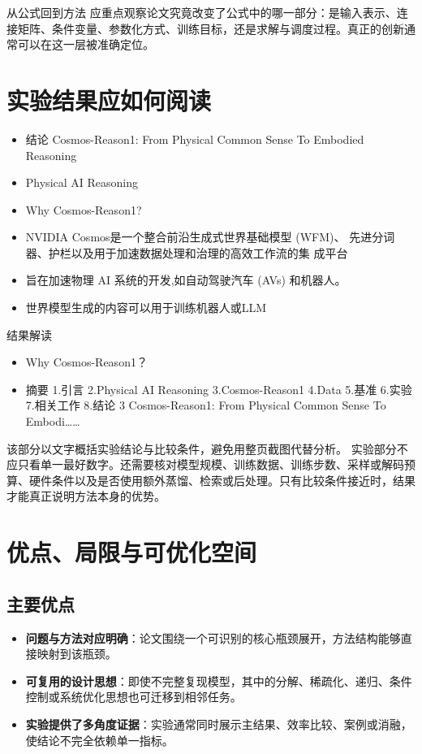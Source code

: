 \documentclass[UTF8,11pt,a4paper]{ctexart}
\newcommand{\term}[1]{\textbf{\textcolor{mainblue}{#1}}}
\begin{document}
\begin{keybox}{从公式回到方法}
应重点观察论文究竟改变了公式中的哪一部分：是输入表示、连接矩阵、条件变量、参数化方式、训练目标，还是求解与调度过程。真正的创新通常可以在这一层被准确定位。
\end{keybox}


\section{实验结果应如何阅读}
\begin{itemize}
\item 结论 Cosmos-Reason1: From Physical Common Sense To Embodied Reasoning
\item Physical AI Reasoning
\item Why Cosmos-Reason1?
\item NVIDIA Cosmos是一个整合前沿生成式世界基础模型 (WFM)、 先进分词器、护栏以及用于加速数据处理和治理的高效工作流的集 成平台
\item 旨在加速物理 AI 系统的开发,如自动驾驶汽车 (AVs) 和机器人。
\item 世界模型生成的内容可以用于训练机器人或LLM
\end{itemize}

\begin{notebox}{结果解读}
\begin{itemize}
\item Why Cosmos-Reason1？
\item 摘要 1.引言 2.Physical AI Reasoning 3.Cosmos-Reason1 4.Data 5.基准 6.实验 7.相关工作 8.结论 3 Cosmos-Reason1: From Physical Common Sense To Embodi……
\end{itemize}
\end{notebox}

该部分以文字概括实验结论与比较条件，避免用整页截图代替分析。
实验部分不应只看单一最好数字。还需要核对模型规模、训练数据、训练步数、采样或解码预算、硬件条件以及是否使用额外蒸馏、检索或后处理。只有比较条件接近时，结果才能真正说明方法本身的优势。

\section{优点、局限与可优化空间}
\subsection{主要优点}
\begin{itemize}
\item \term{问题与方法对应明确}：论文围绕一个可识别的核心瓶颈展开，方法结构能够直接映射到该瓶颈。
\item \term{可复用的设计思想}：即使不完整复现模型，其中的分解、稀疏化、递归、条件控制或系统优化思想也可迁移到相邻任务。
\item \term{实验提供了多角度证据}：实验通常同时展示主结果、效率比较、案例或消融，使结论不完全依赖单一指标。
\end{itemize}
\end{document}
